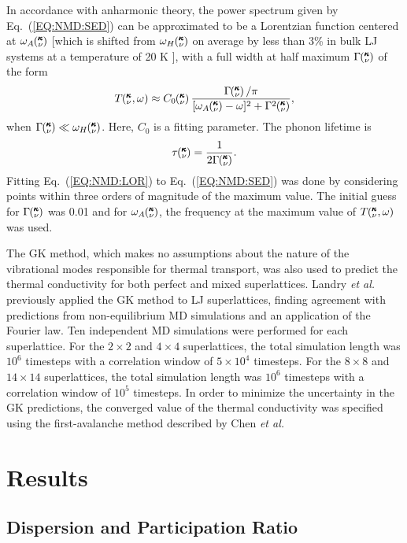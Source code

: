 \documentclass[aps,prb,preprint,preprintnumbers,amsmath,amssymb,floatfix,superscriptaddress]{revtex4}
\newcommand{\kvw}{\mspace{-4.0mu}\left(\mspace{-8.0mu}
\begin{smallmatrix}&\pmb{\kappa} \\&\nu\end{smallmatrix}
\mspace{-2.0mu},\omega\right)}
\newcommand{\kv}{\mspace{-4.0mu}\left(\mspace{-8.0mu}
\begin{smallmatrix}&\pmb{\kappa} \\&\nu\end{smallmatrix}
\mspace{-3.0mu}\right)}
\begin{document}
In accordance with anharmonic theory,\cite{maradudin_scattering_1962} the power spectrum given by Eq.~(\ref{EQ:NMD:SED}) can be approximated to be a Lorentzian function centered at $\omega_A\kv$ [which is shifted from $\omega_H\kv$ on average by less than 3\% in bulk LJ systems at a temperature of 20 K \cite{PhysRevB.79.064301}],  with a full width at half maximum $\Gamma\kv$ of the form 
\begin{equation}\label{EQ:NMD:LOR}
T\kvw \approx C_0\kv\frac{\Gamma\kv/\pi}{[\omega_A\kv-\omega]^2+\Gamma^2\kv},
\end{equation}
when $\Gamma\kv \ll \omega_H\kv$. {\color{red}Here, $C_0$ is a fitting parameter}. The phonon lifetime is\cite {maradudin_scattering_1962}
\begin{equation}\label{EQ:lifetime}
\tau\kv=\frac{1}{2\Gamma\kv}.
\end{equation}
Fitting Eq.~(\ref{EQ:NMD:LOR}) to Eq.~(\ref{EQ:NMD:SED}) was done by considering points within three orders of magnitude of the maximum value. The initial guess for $\Gamma\kv$ was 0.01 and for $\omega_A\kv$, the frequency at the maximum value of $T\kvw$ was used. 

The GK method, which makes no assumptions about the nature of the vibrational modes responsible for thermal transport, was also used to predict the thermal conductivity for both perfect and mixed superlattices. Landry \textit{et al.} previously applied the GK method to LJ superlattices, finding agreement with predictions from non-equilibrium MD simulations and an application of the Fourier law.\cite{PhysRevB.79.075316}
Ten independent MD simulations were performed for each superlattice. For the $2 \times 2$ and $4 \times 4$ superlattices, the total  simulation length was $10^6$ timesteps with a correlation window of $5\times 10^4$ timesteps.  For the $8 \times 8$ and $14 \times 14$ superlattices, the total  simulation length was $10^6$ timesteps with a correlation window of $10^5$ timesteps. In order to minimize the uncertainty in the GK predictions, the converged value of the thermal conductivity was specified using the first-avalanche method described by Chen \textit{et al.} \cite{Chen20102392}

\section{Results}\label{SEC:results}
\subsection{Dispersion and Participation Ratio}
\end{document}

